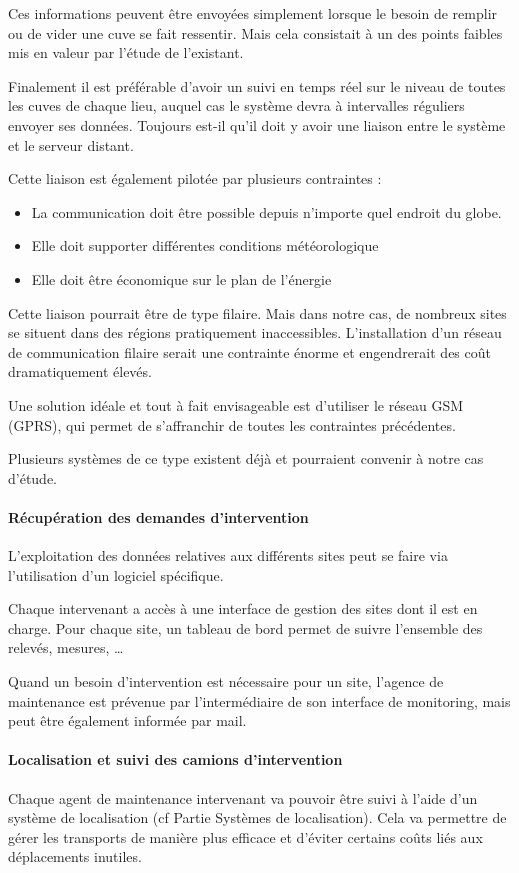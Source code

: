 \documentclass{article}
\begin{document}
Ces informations peuvent être envoyées simplement lorsque le besoin de
remplir ou de vider une cuve se fait ressentir. Mais cela consistait à
un des points faibles mis en valeur par l’étude de l’existant.

Finalement il est préférable d’avoir un suivi en temps réel sur le
niveau de toutes les cuves de chaque lieu, auquel cas le système devra
à intervalles réguliers envoyer ses données. Toujours est-il qu’il doit
y avoir une liaison entre le système et le serveur distant. 

Cette liaison est également pilotée par plusieurs contraintes :

\begin{itemize}
\item La communication doit être possible depuis n’importe quel endroit
du globe.
\item Elle doit supporter différentes conditions météorologique
\item Elle doit être économique sur le plan de l’énergie
\end{itemize}
Cette liaison pourrait être de type filaire. Mais dans notre cas, de
nombreux sites se situent dans des régions pratiquement inaccessibles.
L’installation d’un réseau de communication filaire serait une
contrainte énorme et engendrerait des coût dramatiquement élevés. 

Une solution idéale et tout à fait envisageable est d’utiliser le réseau
GSM (GPRS), qui permet de s’affranchir de toutes les contraintes
précédentes.

Plusieurs systèmes de ce type existent déjà et pourraient convenir à
notre cas d’étude.

\paragraph{Récupération des demandes d’intervention}
L’exploitation des données relatives aux différents sites peut se faire
via l’utilisation d’un logiciel spécifique. 

Chaque intervenant a accès à une interface de gestion des sites dont il
est en charge. Pour chaque site, un tableau de bord permet de suivre
l’ensemble des relevés, mesures, …

Quand un besoin d’intervention est nécessaire pour un site, l’agence de
maintenance est prévenue par l’intermédiaire de son interface de
monitoring, mais peut être également informée par mail.

\paragraph{Localisation et suivi des camions d’intervention}
Chaque agent de maintenance intervenant va pouvoir être suivi à l’aide
d’un système de localisation (cf Partie Systèmes de localisation). Cela
va permettre de gérer les transports de manière plus efficace et
d’éviter certains coûts liés aux déplacements inutiles. 
\end{document}
